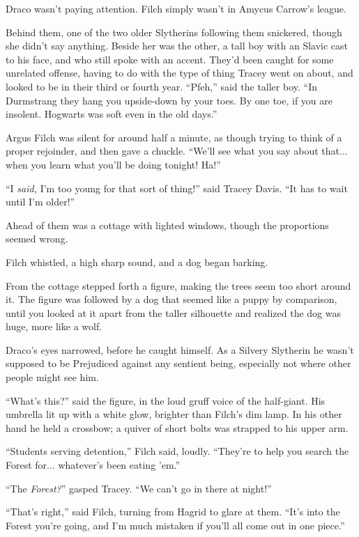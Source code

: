 Draco wasn't paying attention. Filch simply wasn't in Amycus Carrow's league.

Behind them, one of the two older Slytherins following them snickered, though she didn't say anything. Beside her was the other, a tall boy with an Slavic cast to his face, and who still spoke with an accent. They'd been caught for some unrelated offense, having to do with the type of thing Tracey went on about, and looked to be in their third or fourth year. ``Pfeh,'' said the taller boy. ``In Durmstrang they hang you upside-down by your toes. By one toe, if you are insolent. Hogwarts was soft even in the old days.''

Argus Filch was silent for around half a minute, as though trying to think of a proper rejoinder, and then gave a chuckle. ``We'll see what you say about that... when you learn what you'll be doing tonight! Ha!''

``I \emph{said,} I'm too young for that sort of thing!'' said Tracey Davis. ``It has to wait until I'm older!''

Ahead of them was a cottage with lighted windows, though the proportions seemed wrong.

Filch whistled, a high sharp sound, and a dog began barking.

From the cottage stepped forth a figure, making the trees seem too short around it. The figure was followed by a dog that seemed like a puppy by comparison, until you looked at it apart from the taller silhouette and realized the dog was huge, more like a wolf.

Draco's eyes narrowed, before he caught himself. As a Silvery Slytherin he wasn't supposed to be Prejudiced against any sentient being, especially not where other people might see him.

``What's this?'' said the figure, in the loud gruff voice of the half-giant. His umbrella lit up with a white glow, brighter than Filch's dim lamp. In his other hand he held a crossbow; a quiver of short bolts was strapped to his upper arm.

``Students serving detention,'' Filch said, loudly. ``They're to help you search the Forest for... whatever's been eating 'em.''

``The \emph{Forest?}'' gasped Tracey. ``We can't go in there at night!''

``That's right,'' said Filch, turning from Hagrid to glare at them. ``It's into the Forest you're going, and I'm much mistaken if you'll all come out in one piece.''

